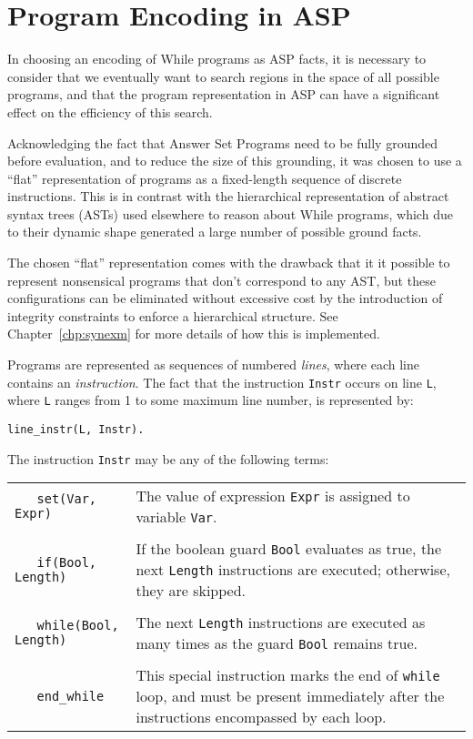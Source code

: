 \documentclass[a4paper,twoside,notitlepage]{report}
\begin{document}
\section{Program Encoding in ASP} \label{sec:progenc}

In choosing an encoding of While programs as ASP facts, it is necessary to 
consider that we eventually want to search regions in the space of all 
possible programs, and that the program representation in ASP can have a 
significant effect on the efficiency of this search.

Acknowledging the fact that Answer Set Programs need to be fully grounded 
before evaluation, and to reduce the size of this grounding, it was chosen 
to use a ``flat'' representation of programs as a fixed-length sequence of 
discrete instructions. This is in contrast with the hierarchical 
representation of abstract syntax trees (ASTs) used elsewhere to reason 
about While programs, which due to their dynamic shape generated a large 
number of possible ground facts.

The chosen ``flat'' representation comes with the drawback that it it 
possible to represent nonsensical programs that don't correspond to any 
AST, but these configurations can be eliminated without excessive cost by 
the introduction of integrity constraints to enforce a hierarchical 
structure. See Chapter~\ref{chp:synexm} for more details of how this is 
implemented.

Programs are represented as sequences of numbered \emph{lines}, where each 
line contains an \emph{instruction}. The fact that the instruction 
\verb|Instr| occurs on line \verb|L|, where \verb|L| ranges from 1 to some 
maximum line number, is represented by:
\begin{Verbatim}[samepage=true]
    line_instr(L, Instr).
\end{Verbatim}

The instruction \verb|Instr| may be any of the following terms:

\begin{tabularx}{\textwidth}{lX}
    \verb|   set(Var, Expr)|
&   The value of expression \verb|Expr| is assigned to variable \verb|Var|.
\\
\\  \verb|   if(Bool, Length)|
&   If the boolean guard \verb|Bool| evaluates as true, the next \verb|Length|
    instructions are executed; otherwise, they are skipped.
\\
\\  \verb|   while(Bool, Length)|
&   The next \verb|Length| instructions are executed as many times as the 
    guard \verb|Bool| remains true.
\\
\\  \verb|   end_while|
&   This special instruction marks the end of \verb|while| loop, and must 
    be present immediately after the instructions encompassed by each loop.
\end{tabularx}
\end{document}
